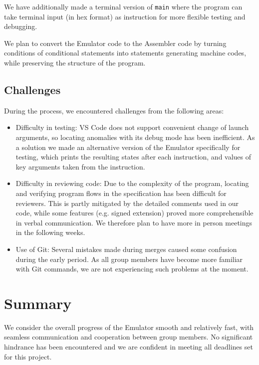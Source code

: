 \documentclass[11pt]{article}
\begin{document}
We have additionally made a terminal version of \texttt{main} where the program can take terminal input (in hex format) as instruction for more flexible testing and debugging.

We plan to convert the Emulator code to the Assembler code by turning conditions of conditional statements into statements generating machine codes, while preserving the structure of the program.

\subsection{Challenges}

During the process, we encountered challenges from the following areas:

\begin{itemize}
    \item Difficulty in testing: VS Code does not support convenient change of launch arguments, so locating anomalies with its debug mode has been inefficient. As a solution we made an alternative version of the Emulator specifically for testing, which prints the resulting states after each instruction, and values of key arguments taken from the instruction.

    \item Difficulty in reviewing code: Due to the complexity of the program, locating and verifying program flows in the specification has been difficult for reviewers. This is partly mitigated by the detailed comments used in our code, while some features (e.g. signed extension) proved more comprehensible in verbal communication. We therefore plan to have more in person meetings in the following weeks.

    \item Use of Git: Several mistakes made during merges caused some confusion during the early period. As all group members have become more familiar with Git commands, we are not experiencing such problems at the moment.
\end{itemize}

\section{Summary}

We consider the overall progress of the Emulator smooth and relatively fast, with seamless communication and cooperation between group members. No significant hindrance has been encountered and we are confident in meeting all deadlines set for this project.
\end{document}
